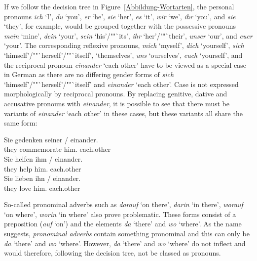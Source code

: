 {If we follow the decision tree in Figure~\ref{Abbildung-Wortarten}, the personal
pronouns \emph{ich} `I', \emph{du} `you', \emph{er} `he', \emph{sie} `her', \emph{es} `it',
\emph{wir} `we', \emph{ihr} `you', and \emph{sie} `they', for example, would be grouped together
with the possessive pronouns \emph{mein} `mine', \emph{dein} `your', \emph{sein} `his'/""`its',
\emph{ihr} `her'/""`their', \emph{unser} `our', and \emph{euer} `your'. The corresponding reflexive pronouns,
\emph{mich} `myself', \emph{dich} `yourself', \emph{sich} `himself'/""`herself'/""`itself',
`themselves', \emph{uns} `ourselves', \emph{euch} `yourself', and the reciprocal pronoun
\emph{einander} `each other' have to be viewed as a special case in German as there are no differing
gender forms of \emph{sich} `himself'/""`herself'/""`itself' and \emph{einander} `each other'. Case is
not expressed morphologically by reciprocal pronouns. By replacing genitive, dative and accusative
pronouns with \emph{einander}, it is possible to see that there must be variants of \emph{einander}
`each other' in these cases, but these variants all share the same form:

\eal
\ex 
\gll Sie gedenken seiner / einander.\\
	 they commemorate him.\gen{} {} each.other\\
\ex 
\gll Sie helfen ihm / einander.\\
	 they help him.\dat{} {} each.other\\
\ex 
\gll Sie lieben ihn / einander.\\
	 they love him.\acc{} {} each.other\\
\zl
%


So-called pronominal adverbs such as \emph{darauf} `on there', \emph{darin} `in there', \emph{worauf} `on where', \emph{worin} `in where'
also prove problematic. These forms consist of a preposition (\eg \emph{auf} `on') and the elements \emph{da} `there' and \emph{wo} `where'. As the name suggests,
\emph{pronominal adverbs} contain something pronominal and this can only be \emph{da} `there' and
\emph{wo} `where'. However, \emph{da} `there' and \emph{wo} `where'  do not inflect and would therefore,
following the decision tree, not be classed as pronouns.

}
